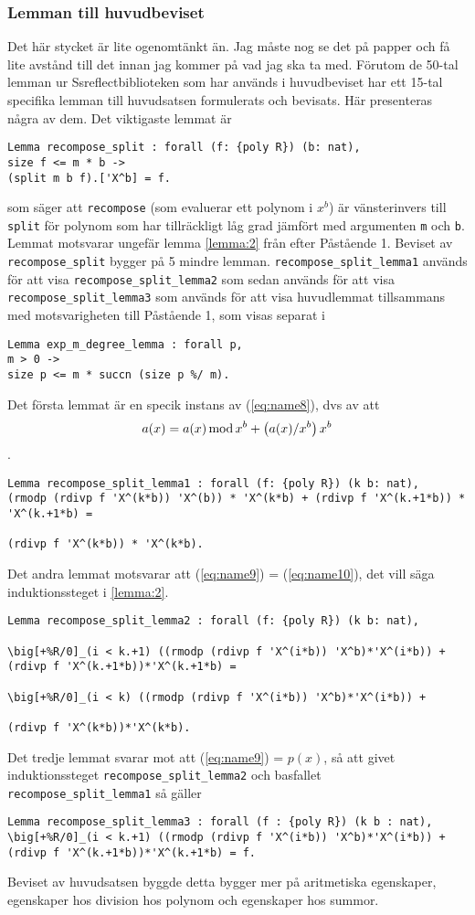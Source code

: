 \subsubsection{Lemman till huvudbeviset}
Det här stycket är lite ogenomtänkt än. Jag måste nog se det på papper och få
lite avstånd till det innan jag kommer på vad jag ska ta med. Förutom de 50-tal
lemman ur Ssreflectbiblioteken som har används i huvudbeviset har ett 15-tal
specifika lemman till huvudsatsen formulerats och bevisats. Här presenteras
några av dem. Det viktigaste lemmat är
\begin{verbatim}
Lemma recompose_split : forall (f: {poly R}) (b: nat),
size f <= m * b ->
(split m b f).['X^b] = f.
\end{verbatim}
som säger att \verb=recompose= (som evaluerar ett polynom i $x^b$) är
vänsterinvers till \verb=split= för polynom som har tillräckligt låg grad
jämfört med argumenten \verb=m= och \verb=b=. Lemmat motsvarar ungefär lemma
\ref{lemma:2} från efter Påstående 1. Beviset av \verb=recompose_split= bygger
på 5 mindre lemman. \verb=recompose_split_lemma1= används för att visa
\verb=recompose_split_lemma2= som sedan används för att visa
\verb=recompose_split_lemma3= som används för att visa huvudlemmat tillsammans
med motsvarigheten till Påstående 1, som visas separat i
\begin{verbatim}
Lemma exp_m_degree_lemma : forall p,
m > 0 ->
size p <= m * succn (size p %/ m).
\end{verbatim}
Det första lemmat är en specik instans av (\ref{eq:name8}), dvs av att
\begin{align}
  a(x)= a(x)  \operatorname*{mod} x^b + \left(a(x)/x^b\right) x^b \label{eq:name8}
\end{align}.
\begin{verbatim}
Lemma recompose_split_lemma1 : forall (f: {poly R}) (k b: nat),
(rmodp (rdivp f 'X^(k*b)) 'X^(b)) * 'X^(k*b) + (rdivp f 'X^(k.+1*b)) * 'X^(k.+1*b) =

(rdivp f 'X^(k*b)) * 'X^(k*b).
\end{verbatim}
Det andra lemmat motsvarar att (\ref{eq:name9}) = (\ref{eq:name10}), det vill
säga induktionssteget
i \ref{lemma:2}.
\begin{verbatim}
Lemma recompose_split_lemma2 : forall (f: {poly R}) (k b: nat),

\big[+%R/0]_(i < k.+1) ((rmodp (rdivp f 'X^(i*b)) 'X^b)*'X^(i*b)) +
(rdivp f 'X^(k.+1*b))*'X^(k.+1*b) =

\big[+%R/0]_(i < k) ((rmodp (rdivp f 'X^(i*b)) 'X^b)*'X^(i*b)) +

(rdivp f 'X^(k*b))*'X^(k*b).
\end{verbatim}
Det tredje lemmat svarar mot att (\ref{eq:name9}) = $p(x)$, så att givet
induktionssteget \verb=recompose_split_lemma2= och basfallet
\verb=recompose_split_lemma1= så gäller
\begin{verbatim}
Lemma recompose_split_lemma3 : forall (f : {poly R}) (k b : nat),
\big[+%R/0]_(i < k.+1) ((rmodp (rdivp f 'X^(i*b)) 'X^b)*'X^(i*b)) +
(rdivp f 'X^(k.+1*b))*'X^(k.+1*b) = f.
\end{verbatim}
Beviset av huvudsatsen byggde detta bygger mer på aritmetiska egenskaper,
egenskaper hos division hos polynom och egenskaper hos summor.

